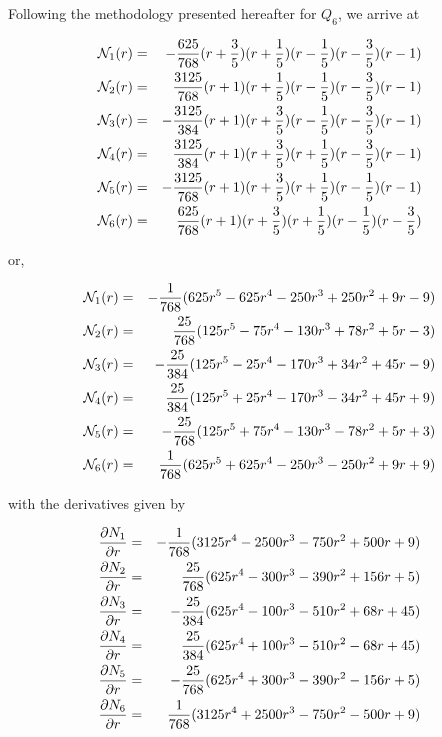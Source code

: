 Following the methodology presented hereafter for $Q_6$, we arrive at 

\begin{eqnarray}
{\mathcal{N}}_1(r) &=& -\frac{625}{768}(r+\frac35)(r+\frac15)(r-\frac15)(r-\frac35)(r-1) \nonumber\\
{\mathcal{N}}_2(r) &=&  \frac{3125}{768}(r+1)(r+\frac15)(r-\frac15)(r-\frac35)(r-1) \nonumber\\
{\mathcal{N}}_3(r) &=& -\frac{3125}{384}(r+1)(r+\frac35)(r-\frac15)(r-\frac35)(r-1) \nonumber\\
{\mathcal{N}}_4(r) &=&  \frac{3125}{384}(r+1)(r+\frac35)(r+\frac15)(r-\frac35)(r-1) \nonumber\\
{\mathcal{N}}_5(r) &=& -\frac{3125}{768}(r+1)(r+\frac35)(r+\frac15)(r-\frac15)(r-1) \nonumber\\
{\mathcal{N}}_6(r) &=&  \frac{625}{768}(r+1)(r+\frac35)(r+\frac15)(r-\frac15)(r-\frac35) 
\end{eqnarray}

or, 

\begin{mdframed}[backgroundcolor=blue!5]
\begin{eqnarray}
{\mathcal{N}}_1(r) &=& -\frac{1}{768} (625r^5-625r^4-250r^3+250r^2+9r-9) \nonumber\\
{\mathcal{N}}_2(r) &=& \frac{25}{768} (125r^5-75r^4-130r^3+78r^2+5r-3) \nonumber\\
{\mathcal{N}}_3(r) &=& -\frac{25}{384} (125r^5-25r^4-170r^3+34r^2+45r-9) \nonumber\\
{\mathcal{N}}_4(r) &=& \frac{25}{384} (125r^5+25r^4-170r^3-34r^2+45r+9) \nonumber\\
{\mathcal{N}}_5(r) &=& -\frac{25}{768} (125r^5+75r^4-130r^3-78r^2+5r+3) \nonumber\\
{\mathcal{N}}_6(r) &=& \frac{1}{768} (625r^5+625r^4-250r^3-250r^2+9r+9) 
\end{eqnarray}
\end{mdframed}

with the derivatives given by

\begin{mdframed}[backgroundcolor=blue!5]
\begin{eqnarray}
\frac{\partial N_1}{\partial r}&=& -\frac{1}{768}(3125r^4-2500r^3-750r^2+500r+9 ) \nonumber\\ 
\frac{\partial N_2}{\partial r}&=& \frac{25}{768}(625r^4-300r^3-390r^2+156r+5  ) \nonumber\\ 
\frac{\partial N_3}{\partial r}&=& -\frac{25}{384}(625r^4-100r^3-510r^2+68r+45  ) \nonumber\\ 
\frac{\partial N_4}{\partial r}&=& \frac{25}{384}(625r^4+100r^3-510r^2-68r+45  ) \nonumber\\ 
\frac{\partial N_5}{\partial r}&=& -\frac{25}{768}(625r^4+300r^3-390r^2-156r+5  ) \nonumber\\ 
\frac{\partial N_6}{\partial r}&=& \frac{1}{768}(3125r^4+2500r^3-750r^2-500r+9 ) 
\end{eqnarray}
\end{mdframed}




